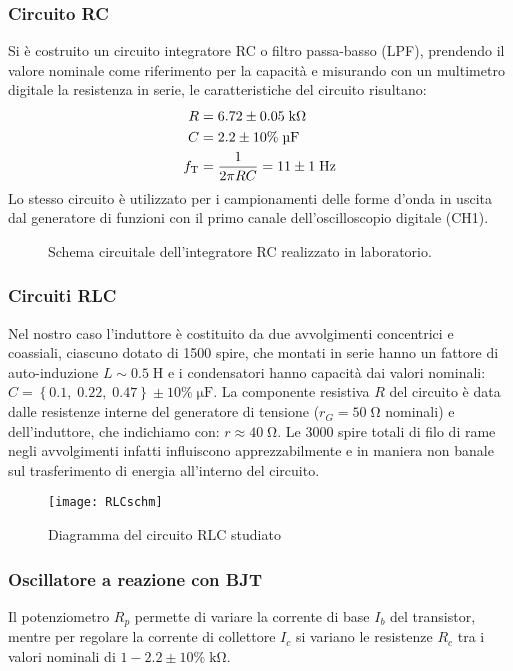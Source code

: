 \documentclass{article}[a4paper, oneside, 11pt]
\begin{document}
\subsubsection{Circuito RC}
Si è costruito un circuito integratore RC o filtro passa-basso (LPF),
prendendo il valore nominale come riferimento per la capacità e misurando
con un multimetro digitale la resistenza in serie, le caratteristiche del
circuito risultano:
\begin{align*}
R &= 6.72 \pm 0.05 \; \si{\kilo\ohm}\\
C &= 2.2 \pm 10\% \; \si{\micro\F}\\
f_{\rm T} &= \frac{1}{2 \pi R C} = 11 \pm 1 \; \si{\hertz}
\end{align*}
Lo stesso circuito è utilizzato per i campionamenti delle forme d'onda in
uscita dal generatore di funzioni con il primo canale dell'oscilloscopio
digitale (CH1).
\begin{figure}[!htb]
	\centering
	
	\caption{Schema circuitale dell'integratore RC realizzato in laboratorio.
	\label{fig: RC}}
\end{figure}

\subsubsection{Circuiti RLC}
Nel nostro caso l'induttore è costituito da due avvolgimenti concentrici
e coassiali, ciascuno dotato di 1500 spire, che montati in serie hanno un
fattore di auto-induzione $L \sim 0.5 \; \si{\henry}$ e i condensatori hanno
capacità dai valori nominali: $C = \left\{0.1,\; 0.22,\; 0.47\right\} \pm
10\% \; \si{\micro\farad}$. La componente resistiva $R$ del circuito è data
dalle resistenze interne del generatore di tensione ($r_G = 50 \; \si{\ohm}$
nominali) e dell'induttore, che indichiamo con: $r \approx 40 \;\si{\ohm}$.
Le $3000$ spire totali di filo di rame negli avvolgimenti infatti
influiscono apprezzabilmente e in maniera non banale sul trasferimento
di energia all'interno del circuito.

\begin{figure}[!htb]
	\centering 
		\texttt{[image: RLCschm]}
	\caption{Diagramma del circuito RLC studiato\label{schm: RLC}}
\end{figure}

\subsubsection{Oscillatore a reazione con BJT}
Il potenziometro $R_p$ permette di variare la corrente di base $I_b$ 
del transistor, mentre per regolare la corrente di collettore $I_c$ si variano
le resistenze $R_c$ tra i valori nominali di $1 - 2.2 \pm 10 \% \; 
\si{\kilo\ohm}$. 
\end{document}
